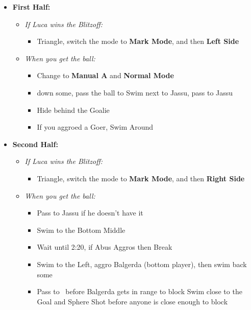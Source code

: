 \begin{blitzball}
    \begin{itemize}
        \item \textbf{First Half:}
        \begin{itemize}
            \item \textit{If Luca wins the Blitzoff:}
            \begin{itemize}
                \item Triangle, switch the mode to \textbf{Mark Mode}, and then \textbf{Left Side}
            \end{itemize}
            \item \textit{When you get the ball:}
            \begin{itemize}
                \item Change to \textbf{Manual A} and \textbf{Normal Mode}
                \item down some, pass the ball to \tidus
                \tidusf Swim next to Jassu, pass to Jassu
                \item Hide behind the Goalie
                \item If you aggroed a Goer, Swim Around
            \end{itemize}
        \end{itemize}
        \item \textbf{Second Half:}
        \begin{itemize}
            \item \textit{If Luca wins the Blitzoff:}
            \begin{itemize}
                \item Triangle, switch the mode to \textbf{Mark Mode}, and then \textbf{Right Side}
            \end{itemize}
            \item \textit{When you get the ball:}
            \begin{itemize}
                \item Pass to Jassu if he doesn't have it
                \item Swim to the Bottom Middle
                \item Wait until 2:20, if Abus Aggros then Break
                \item Swim to the Left, aggro Balgerda (bottom player), then swim back some
                \item Pass to \tidus\ before Balgerda gets in range to block
                \tidusf Swim close to the Goal and Sphere Shot before anyone is close enough to block

\end{itemize}
\end{itemize}
\end{itemize}
\end{blitzball}
